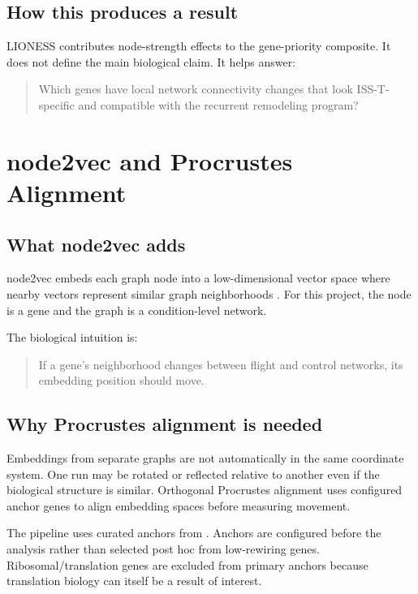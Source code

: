 \documentclass[11pt]{article}
\begin{document}
\subsection{How this produces a result}

LIONESS contributes node-strength effects to the gene-priority composite. It does not define the main biological claim. It helps answer:

\begin{quote}
Which genes have local network connectivity changes that look ISS-T-specific and compatible with the recurrent remodeling program?
\end{quote}

\section{node2vec and Procrustes Alignment}

\subsection{What node2vec adds}

node2vec embeds each graph node into a low-dimensional vector space where nearby vectors represent similar graph neighborhoods \citep{grover2016node2vec}. For this project, the node is a gene and the graph is a condition-level network.

The biological intuition is:

\begin{quote}
If a gene's neighborhood changes between flight and control networks, its embedding position should move.
\end{quote}

\subsection{Why Procrustes alignment is needed}

Embeddings from separate graphs are not automatically in the same coordinate system. One run may be rotated or reflected relative to another even if the biological structure is similar. Orthogonal Procrustes alignment uses configured anchor genes to align embedding spaces before measuring movement.

The pipeline uses curated anchors from . Anchors are configured before the analysis rather than selected post hoc from low-rewiring genes. Ribosomal/translation genes are excluded from primary anchors because translation biology can itself be a result of interest.
\end{document}
